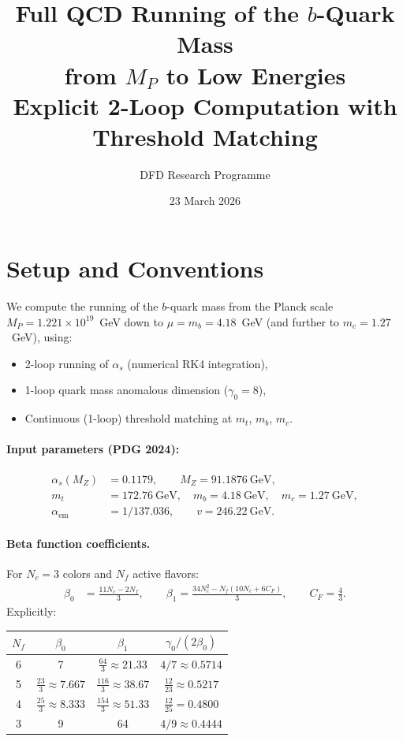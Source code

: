 \documentclass[11pt]{article}
\title{Full QCD Running of the $b$-Quark Mass\\from $M_P$ to Low Energies\\[6pt]
\large Explicit 2-Loop Computation with Threshold Matching}
\author{DFD Research Programme}
\date{23 March 2026}
\begin{document}
\maketitle

\section{Setup and Conventions}

We compute the running of the $b$-quark mass from the Planck scale $M_P = 1.221 \times 10^{19}$~GeV down to $\mu = m_b = 4.18$~GeV (and further to $m_c = 1.27$~GeV), using:
\begin{itemize}
\item 2-loop running of $\alpha_s$ (numerical RK4 integration),
\item 1-loop quark mass anomalous dimension ($\gamma_0 = 8$),
\item Continuous (1-loop) threshold matching at $m_t$, $m_b$, $m_c$.
\end{itemize}

\paragraph{Input parameters (PDG 2024):}
\begin{align}
\alpha_s(M_Z) &= 0.1179, \qquad M_Z = 91.1876~\text{GeV}, \nonumber\\
m_t &= 172.76~\text{GeV}, \quad m_b = 4.18~\text{GeV}, \quad m_c = 1.27~\text{GeV}, \nonumber\\
\alpha_{\mathrm{em}} &= 1/137.036, \qquad v = 246.22~\text{GeV}.
\end{align}

\paragraph{Beta function coefficients.}
For $N_c = 3$ colors and $N_f$ active flavors:
\begin{align}
\beta_0 &= \frac{11 N_c - 2 N_f}{3}, \qquad
\beta_1 = \frac{34 N_c^2 - N_f(10 N_c + 6 C_F)}{3}, \qquad C_F = \tfrac{4}{3}.
\end{align}
Explicitly:
\begin{center}
\begin{tabular}{cccc}
\toprule
$N_f$ & $\beta_0$ & $\beta_1$ & $\gamma_0/(2\beta_0)$ \\
\midrule
6 & 7 & $\tfrac{64}{3} \approx 21.33$ & $4/7 \approx 0.5714$ \\[3pt]
5 & $\tfrac{23}{3} \approx 7.667$ & $\tfrac{116}{3} \approx 38.67$ & $\tfrac{12}{23} \approx 0.5217$ \\[3pt]
4 & $\tfrac{25}{3} \approx 8.333$ & $\tfrac{154}{3} \approx 51.33$ & $\tfrac{12}{25} = 0.4800$ \\[3pt]
3 & 9 & 64 & $4/9 \approx 0.4444$ \\
\bottomrule
\end{tabular}
\end{center}
\end{document}
